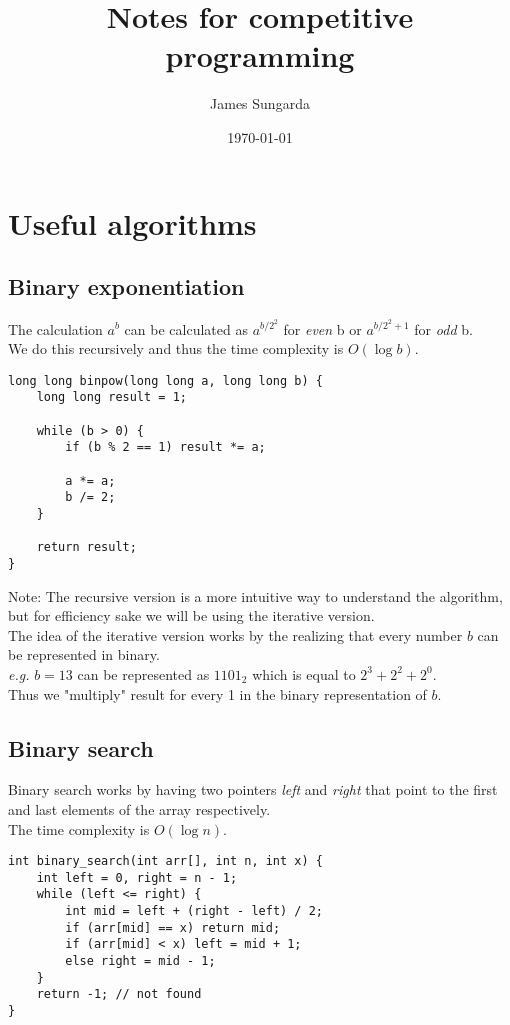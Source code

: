 \documentclass{cpnote}
\begin{document}
\title{Notes for competitive programming}
\author{James Sungarda}
\date{\today}
\maketitle

\section{Useful algorithms}

\subsection{Binary exponentiation}
The calculation \(a^b\) can be calculated as \(a^{{b/2}^2}\) for \emph{even} b or \(a^{{b/2}^2 + 1}\) for \emph{odd} b. \\
We do this recursively and thus the time complexity is \(O(\log b)\).

\begin{verbatim}
long long binpow(long long a, long long b) {
    long long result = 1;

    while (b > 0) {
        if (b % 2 == 1) result *= a;

        a *= a;
        b /= 2;
    }

    return result;
}
\end{verbatim}

Note: The recursive version is a more intuitive way to understand the algorithm, but for efficiency sake we will be using the iterative version.\\
The idea of the iterative version works by the realizing that every number \(b\) can be represented in binary. \\
\textit{e.g.} \(b = 13\) can be represented as \(1101_2\) which is equal to \(2^3 + 2^2 + 2^0\). \\
Thus we "multiply" result for every 1 in the binary representation of \(b\).

\subsection{Binary search}
Binary search works by having two pointers \emph{left} and \emph{right} that point to the first and last elements of the array respectively. \\
The time complexity is \(O(\log n)\).
\begin{verbatim}
int binary_search(int arr[], int n, int x) {
    int left = 0, right = n - 1;
    while (left <= right) {
        int mid = left + (right - left) / 2;
        if (arr[mid] == x) return mid;
        if (arr[mid] < x) left = mid + 1;
        else right = mid - 1;
    }
    return -1; // not found
}
\end{verbatim}
\end{document}
